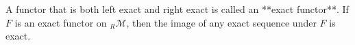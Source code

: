 A functor that is both left exact and right exact is called an **exact functor**. If $F$ is an exact functor on ${}_R\mathcal{M}$, then the image of any exact sequence under $F$ is exact.
